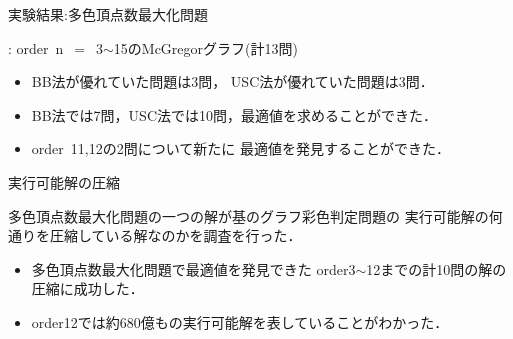 \documentclass[dvipdfmx,11pt]{beamer}
\begin{document}
\begin{frame}{実験結果:多色頂点数最大化問題}

 \begin{block}{}
  : order\ n~$=$~3$\sim$15のMcGregorグラフ(計13問)
 \end{block}
 
 \begin{center}
  
 \end{center}

 \begin{itemize}
  \item BB法が優れていた問題は3問，
        USC法が優れていた問題は3問．%
  \item BB法では7問，USC法では10問，最適値を求めることができた．
  \item order~11,12の2問について新たに
        最適値を発見することができた．%
 \end{itemize}

\end{frame}


\begin{frame}{実行可能解の圧縮}
 \begin{block}{}
  多色頂点数最大化問題の一つの解が基のグラフ彩色判定問題の
  実行可能解の何通りを圧縮している解なのかを調査を行った．
 \end{block}
 
 \begin{center}
  
 \end{center}

 \begin{itemize}
  \item 多色頂点数最大化問題で最適値を発見できた
        order3$\sim$12までの計10問の解の圧縮に成功した．
  \item order12では約680億もの実行可能解を表していることがわかった．
 \end{itemize}

\end{frame}

\end{document}
